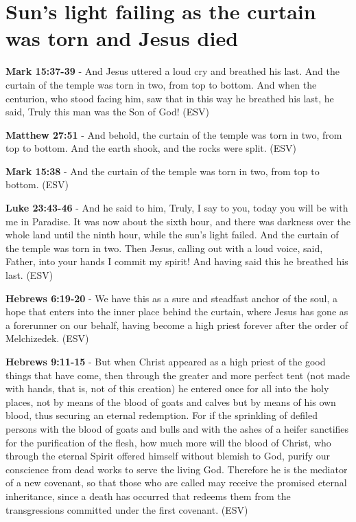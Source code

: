 \documentclass[11pt]{article}
\begin{document}
\section{Sun's light failing as the curtain was torn and Jesus died}
\label{sec:org0acfded}
\textbf{Mark 15:37-39} - And Jesus uttered a loud cry and breathed his last. And the curtain of the temple was torn in two, from top to bottom. And when the centurion, who stood facing him, saw that in this way he breathed his last, he said, Truly this man was the Son of God! (ESV)

\textbf{Matthew 27:51} - And behold, the curtain of the temple was torn in two, from top to bottom. And the earth shook, and the rocks were split. (ESV)

\textbf{Mark 15:38} - And the curtain of the temple was torn in two, from top to bottom. (ESV)

\textbf{Luke 23:43-46} - And he said to him, Truly, I say to you, today you will be with me in Paradise. It was now about the sixth hour, and there was darkness over the whole land until the ninth hour, while the sun's light failed. And the curtain of the temple was torn in two. Then Jesus, calling out with a loud voice, said, Father, into your hands I commit my spirit! And having said this he breathed his last. (ESV)

\textbf{Hebrews 6:19-20} - We have this as a sure and steadfast anchor of the soul, a hope that enters into the inner place behind the curtain, where Jesus has gone as a forerunner on our behalf, having become a high priest forever after the order of Melchizedek. (ESV)

\textbf{Hebrews 9:11-15} - But when Christ appeared as a high priest of the good things that have come, then through the greater and more perfect tent (not made with hands, that is, not of this creation) he entered once for all into the holy places, not by means of the blood of goats and calves but by means of his own blood, thus securing an eternal redemption. For if the sprinkling of defiled persons with the blood of goats and bulls and with the ashes of a heifer sanctifies for the purification of the flesh, how much more will the blood of Christ, who through the eternal Spirit offered himself without blemish to God, purify our conscience from dead works to serve the living God. Therefore he is the mediator of a new covenant, so that those who are called may receive the promised eternal inheritance, since a death has occurred that redeems them from the transgressions committed under the first covenant. (ESV)
\end{document}
